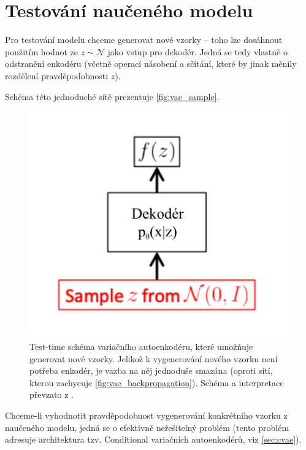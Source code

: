 \newpage
\section{Testování naučeného modelu}
Pro testování modelu chceme generovat nové vzorky – toho lze dosáhnout použitím hodnot ze $z \sim \mathcal{N}$ jako vstup pro dekodér.
Jedná se tedy vlastně o odstranění enkodéru (včetně operací násobení a sčítání, které by jinak měnily rozdělení pravděpodobnosti $z$). \cite{Doersch2021}

Schéma této jednoduché sítě prezentuje \autoref{fig:vae_sample}.

\begin{figure}[H]
    \centering
    \includegraphics{figures/vae_sample.pdf}
    \caption{Test-time schéma variačního autoenkodéru, které umožňuje generovat nové vzorky. Jelikož k vygenerování nového vzorku není potřeba enkodér, je vazba na něj jednoduše smazána (oproti sítí, kterou zachycuje \autoref{fig:vae_backpropagation}). Schéma a interpretace převzato z \cite{Doersch2021}.}
    \label{fig:vae_sample}
\end{figure}

Chceme-li vyhodnotit pravděpodobnost vygenerování konkrétního vzorku z naučeného modelu, jedná se o efektivně neřešitelný problém (tento problém adresuje architektura tzv. Conditional variačních autoenkodérů, viz \autoref{sec:cvae}).